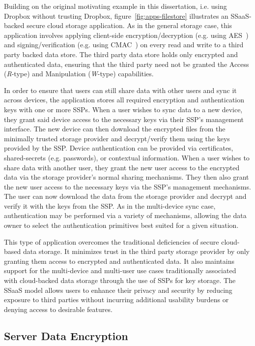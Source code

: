 Building on the original motivating example in this dissertation,
i.e. using Dropbox without trusting Dropbox,
figure~\ref{fig:apps-filestore} illustrates an SSaaS-backed secure
cloud storage application. As in the general storage case, this
application involves applying client-side encryption/decryption
(e.g. using AES~\cite{nist2001}) and signing/verification (e.g. using
CMAC~\cite{dworkin2005}) on every read and write to a third party
backed data store. The third party data store holds only encrypted and
authenticated data, ensuring that the third party need not be granted
the Access (\emph{R}-type) and Manipulation (\emph{W}-type)
capabilities.

In order to ensure that users can still share data with other users
and sync it across devices, the application stores all required
encryption and authentication keys with one or more SSPs. When a user
wishes to sync data to a new device, they grant said device access to
the necessary keys via their SSP's management interface. The new
device can then download the encrypted files from the minimally
trusted storage provider and decrypt/verify them using the keys
provided by the SSP. Device authentication can be provided via
certificates, shared-secrets (e.g. passwords), or contextual
information. When a user wishes to share data with another user, they
grant the new user access to the encrypted data via the storage
provider's normal sharing mechanisms. They then also grant the new
user access to the necessary keys via the SSP's management
mechanisms. The user can now download the data from the storage
provider and decrypt and verify it with the keys from the SSP. As in
the multi-device sync case, authentication may be performed via a
variety of mechanisms, allowing the data owner to select the
authentication primitives best suited for a given situation.

This type of application overcomes the traditional deficiencies of
secure cloud-based data storage. It minimizes trust in the third party
storage provider by only granting them access to encrypted and
authenticated data. It also maintains support for the multi-device and
multi-user use cases traditionally associated with cloud-backed data
storage through the use of SSPs for key storage. The SSaaS model
allows users to enhance their privacy and security by reducing
exposure to third parties without incurring additional usability
burdens or denying access to desirable features.

\subsection{Server Data Encryption}


